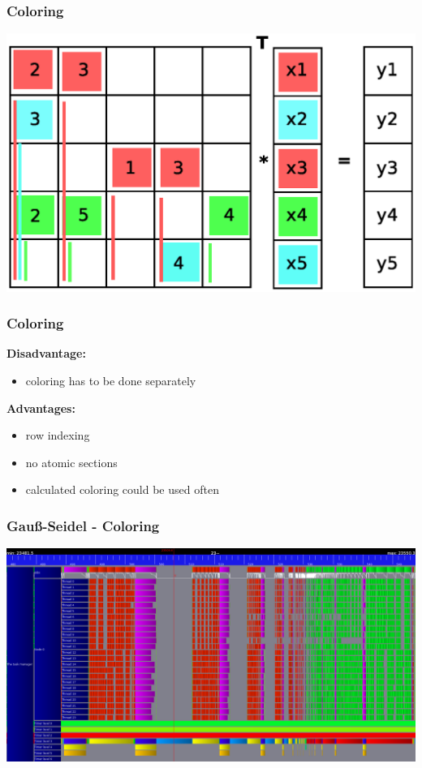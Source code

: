 \documentclass{beamer}
\begin{document}
\begin{frame}
\frametitle{Coloring}
\includegraphics[width=0.8\linewidth]{graphic/coloringT10.eps}
\end{frame}

\begin{frame}
\frametitle{Coloring}
\textbf{Disadvantage:}
\begin{itemize}
\item coloring has to be done separately
\end{itemize}

\textbf{Advantages:}
\begin{itemize}
\item row indexing
\item no atomic sections
\item calculated coloring could be used often
\end{itemize}
\end{frame}


\begin{frame}
\frametitle{Gau\ss-Seidel - Coloring}
\includegraphics[width=1\linewidth]{undistributed_coloring_gs.png}
\end{frame}
\end{document}
